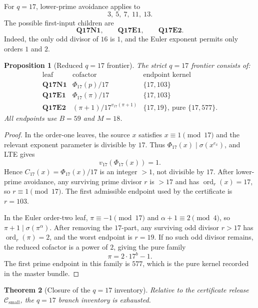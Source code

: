 \documentclass[11pt]{article}
\newtheorem{theorem}{Theorem}[section]
\newtheorem{proposition}[theorem]{Proposition}
\theoremstyle{definition}
\theoremstyle{remark}
\DeclareMathOperator{\ord}{ord}
\newcommand{\Csmall}{\ensuremath{\mathcal C_{\mathrm{small}}}}
\begin{document}
For \(q=17\), lower-prime avoidance applies to
\[
  3,\ 5,\ 7,\ 11,\ 13.
\]
The possible first-input children are
\[
  \mathbf{Q17N1},\qquad \mathbf{Q17E1},\qquad \mathbf{Q17E2}.
\]
Indeed, the only odd divisor of \(16\) is \(1\), and the Euler exponent permits
only orders \(1\) and \(2\).

\begin{proposition}[Reduced \(q=17\) frontier]
\label{prop:q17-frontier}
The strict \(q=17\) frontier consists of:
\[
\begin{array}{c|c|c}
\text{leaf} & \text{cofactor} & \text{endpoint kernel}\\
\hline
\mathbf{Q17N1} & \Phi_{17}(p)/17 & \{17,103\}\\
\mathbf{Q17E1} & \Phi_{17}(\pi)/17 & \{17,103\}\\
\mathbf{Q17E2} & (\pi+1)/17^{v_{17}(\pi+1)} & \{17,19\},\ \text{pure }\{17,577\}.
\end{array}
\]
All endpoints use \(B=59\) and \(M=18\).
\end{proposition}

\begin{proof}
In the order-one leaves, the source \(x\) satisfies \(x\equiv1\pmod{17}\) and
the relevant exponent parameter is divisible by \(17\).  Thus
\(\Phi_{17}(x)\mid\sigma(x^{e_x})\), and LTE gives
\[
  v_{17}(\Phi_{17}(x))=1.
\]
Hence \(C_{17}(x)=\Phi_{17}(x)/17\) is an integer \(>1\), not divisible by
\(17\).  After lower-prime avoidance, any surviving prime divisor \(r\) is
\(>17\) and has \(\ord_r(x)=17\), so \(r\equiv1\pmod{17}\).  The first
admissible endpoint used by the certificate is \(r=103\).

In the Euler order-two leaf, \(\pi\equiv-1\pmod{17}\) and
\(\alpha+1\equiv2\pmod4\), so \(\pi+1\mid\sigma(\pi^\alpha)\).  After removing
the \(17\)-part, any surviving odd divisor \(r>17\) has \(\ord_r(\pi)=2\), and
the worst endpoint is \(r=19\).  If no such odd divisor remains, the reduced
cofactor is a power of \(2\), giving the pure family
\[
  \pi=2\cdot17^b-1.
\]
The first prime endpoint in this family is \(577\), which is the pure kernel
recorded in the master bundle.
\end{proof}

\begin{theorem}[Closure of the \(q=17\) inventory]
\label{thm:q17-closed}
Relative to the certificate release \(\Csmall\), the \(q=17\) branch inventory is
exhausted.
\end{theorem}
\end{document}
